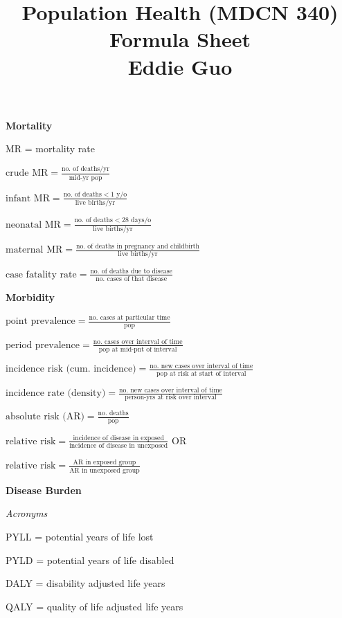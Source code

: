 \documentclass[twocolumn]{article}
\title{
	\vspace{-2em}
	\normalsize \textbf{Population Health (MDCN 340) Formula Sheet} \\
	\small Eddie Guo \\
	\dotfill
	\vspace{-5em}
}
\date{}
\begin{document}
\maketitle

\small

\textbf{Mortality}

MR = mortality rate

$\text{crude MR} = \frac{\text{no. of deaths/yr}}{\text{mid-yr pop}}$

$\text{infant MR} = \frac{\text{no. of deaths} <1 \text{ y/o}}{\text{live births/yr}}$

$\text{neonatal MR} = \frac{\text{no. of deaths} <28 \text{ days/o}}{\text{live births/yr}}$

$\text{maternal MR} = \frac{\text{no. of deaths in pregnancy and childbirth}}{\text{live births/yr}}$

$\text{case fatality rate} = \frac{\text{no. of deaths due to disease}}{\text{no. cases of that disease}}$

\dotfill

\textbf{Morbidity}

$\text{point prevalence} = \frac{\text{no. cases at particular time}}{\text{pop}}$

$\text{period prevalence} = \frac{\text{no. cases over interval of time}}{\text{pop at mid-pnt of interval}}$

$\text{incidence risk (cum. incidence)} = \frac{\text{no. new cases over interval of time}}{\text{pop at risk at start of interval}}$

$\text{incidence rate (density)} = \frac{\text{no. new cases over interval of time}}{\text{person-yrs at risk over interval}}$

$\text{absolute risk (AR)} = \frac{\text{no. deaths}}{\text{pop}}$

$\text{relative risk} = \frac{\text{incidence of disease in exposed}}{\text{incidence of disease in unexposed}}$ \hfill OR

$\text{relative risk} = \frac{\text{AR in exposed group}}{\text{AR in unexposed group}}$

\dotfill

\textbf{Disease Burden}

\textit{Acronyms}

PYLL = potential years of life lost

PYLD = potential years of life disabled

DALY = disability adjusted life years

QALY = quality of life adjusted life years
\end{document}
